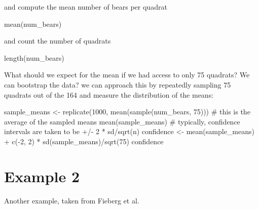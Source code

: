 \documentclass[
  letterpaper,
  DIV=11,
  numbers=noendperiod]{scrreprt}
\newenvironment{Shaded}{\begin{snugshade}}{\end{snugshade}}
\newcommand{\NormalTok}[1]{\textcolor[rgb]{0.00,0.23,0.31}{#1}}
\begin{document}
and compute the mean number of bears per quadrat

\begin{Shaded}
\begin{Highlighting}[]
\NormalTok{mean(num\_bears)}
\end{Highlighting}
\end{Shaded}

and count the number of quadrats

\begin{Shaded}
\begin{Highlighting}[]
\NormalTok{length(num\_bears)}
\end{Highlighting}
\end{Shaded}

What should we expect for the mean if we had access to only 75 quadrats?
We can bootstrap the data? we can approach this by repeatedly sampling
75 quadrats out of the 164 and measure the distribution of the means:

\begin{Shaded}
\begin{Highlighting}[]
\NormalTok{sample\_means \textless{}{-} replicate(1000, mean(sample(num\_bears, 75)))}
\NormalTok{\# this is the average of the sampled means}
\NormalTok{mean(sample\_means)}
\NormalTok{\# typically, confidence intervals are taken to be +/{-} 2 * sd/sqrt(n)}
\NormalTok{confidence \textless{}{-} mean(sample\_means) + c({-}2, 2) * sd(sample\_means)/sqrt(75)}
\NormalTok{confidence}
\end{Highlighting}
\end{Shaded}

\section{Example 2}\label{example-2}

Another example, taken from Fieberg et al.
\end{document}
